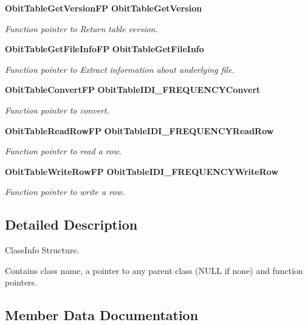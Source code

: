 \begin{CompactItemize}
{\bf Obit\-Table\-Get\-Version\-FP} {\bf Obit\-Table\-Get\-Version}
\begin{CompactList}\small\item\em Function pointer to Return table version. \item\end{CompactList}\item 
{\bf Obit\-Table\-Get\-File\-Info\-FP} {\bf Obit\-Table\-Get\-File\-Info}
\begin{CompactList}\small\item\em Function pointer to Extract information about underlying file. \item\end{CompactList}\item 
{\bf Obit\-Table\-Convert\-FP} {\bf Obit\-Table\-IDI\_\-FREQUENCYConvert}
\begin{CompactList}\small\item\em Function pointer to convert. \item\end{CompactList}\item 
{\bf Obit\-Table\-Read\-Row\-FP} {\bf Obit\-Table\-IDI\_\-FREQUENCYRead\-Row}
\begin{CompactList}\small\item\em Function pointer to read a row. \item\end{CompactList}\item 
{\bf Obit\-Table\-Write\-Row\-FP} {\bf Obit\-Table\-IDI\_\-FREQUENCYWrite\-Row}
\begin{CompactList}\small\item\em Function pointer to write a row. \item\end{CompactList}\end{CompactItemize}


\subsection{Detailed Description}
Class\-Info Structure. 

Contains class name, a pointer to any parent class (NULL if none) and function pointers. 



\subsection{Member Data Documentation}

